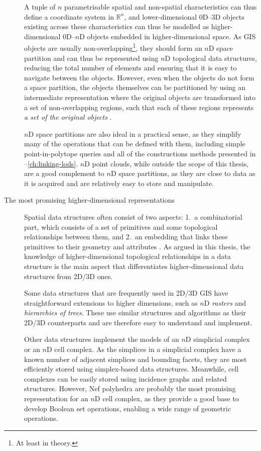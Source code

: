 \begin{description}
A tuple of $n$ parametrisable spatial and non-spatial characteristics can thus define a coordinate system in $\mathbb{R}^n$, and lower-dimensional 0D--3D objects existing across these characteristics can thus be modelled as higher-dimensional 0D--$n$D objects embedded in higher-dimensional space.
As GIS objects are usually non-overlapping\footnote{At least in theory.}, they should form an $n$D space partition and can thus be represented using $n$D topological data structures, reducing the total number of elements and ensuring that it is easy to navigate between the objects.
However, even when the objects do not form a space partition, the objects themselves can be partitioned by using an intermediate representation where the original objects are transformed into a set of non-overlapping regions, such that each of these regions represents \emph{a set of the original objects} \citep{Rossignac89}.

$n$D space partitions are also ideal in a practical sense, as they simplify many of the operations that can be defined with them, including simple point-in-polytope queries and all of the constructions methods presented in --\ref{ch:linking-lods}.
$n$D point clouds, while outside the scope of this thesis, are a good complement to $n$D space partitions, as they are close to data as it is acquired and are relatively easy to store and manipulate.

\item[The most promising higher-dimensional representations]

Spatial data structures often consist of two aspects: 1.\ a combinatorial part, which consists of a set of primitives and some topological relationships between them, and 2.\ an embedding that links these primitives to their geometry and attributes \citep{Lienhardt94}.
As argued in this thesis, the knowledge of higher-dimensional topological relationships in a data structure is the main aspect that differentiates higher-dimensional data structures from 2D/3D ones.

Some data structures that are frequently used in 2D/3D GIS have straightforward extensions to higher dimensions, such as $n$D \emph{rasters} and \emph{hierarchies of trees}.
These use similar structures and algorithms as their 2D/3D counterparts and are therefore easy to understand and implement.

Other data structures implement the models of an $n$D simplicial complex or an $n$D cell complex.
As the simplices in a simplicial complex have a known number of adjacent simplices and bounding facets, they are most efficiently stored using simplex-based data structures.
Meanwhile, cell complexes can be easily stored using incidence graphs and related structures.
However, Nef polyhedra \citep{Bieri88} are probably the most promising representation for an $n$D cell complex, as they provide a good base to develop Boolean set operations, enabling a wide range of geometric operations.


\end{description}

